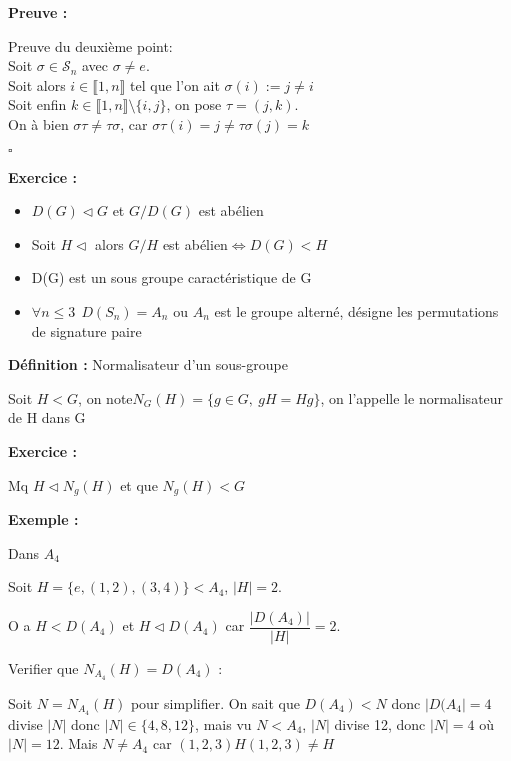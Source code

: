 \documentclass{report}
\renewenvironment{leftbar}{%
  \def\FrameCommand{\vrule width 0.4pt \hspace{10pt}}%
  \MakeFramed {\advance\hsize-\width \FrameRestore}}%
 {\endMakeFramed}%
\newenvironment{definition}[1][]{
    \begin{tcolorbox}[colframe= white]
    \textbf{Définition :} 
    #1 \par
    }
    {\end{tcolorbox}}
\newenvironment{preuve}{\vspace*{0.5cm}
    \begin{leftbar}
    \noindent\textbf{Preuve :}\par}{
    \begin{flushright}
    $\square$
    \end{flushright}
    \end{leftbar}
}
\newenvironment{exemple}{\begin{tcolorbox}[colback=gray!10,colframe= white]
    \textbf{Exemple :}
     \par}
    {\end{tcolorbox}}
\newenvironment{exo}{\begin{tcolorbox}[colframe= white]
    \textbf{Exercice :}
    \par}
    {\end{tcolorbox}}
\newcommand{\sn}{\mathcal{S}_{n}}
\begin{document}
\begin{preuve}
    Preuve du deuxième point:\\
    Soit $\sigma \in \sn$ avec $\sigma \neq e$.\\
    Soit alors $i\in \llbracket 1,n \rrbracket$ tel que l'on ait $\sigma(i):=j\neq i$\\
    Soit enfin $k\in \llbracket 1,n \rrbracket \setminus \{i,j\}$, on pose $\tau = (j,k)$.\\
    On à bien $\sigma\tau\neq\tau\sigma$, car $\sigma\tau(i)=j\neq\tau\sigma(j)=k$
\end{preuve}


\begin{exo}
    \begin{itemize}
        \item $D(G)\vartriangleleft G$ et $G/D(G)$ est abélien
        \item Soit $H \vartriangleleft$ alors $G/H$ est abélien$\Leftrightarrow D(G)<H$
        \item D(G) est un sous groupe caractéristique de G
        \item $\forall n \leq3 ~~D(S_{n})=A_{n}$ ou $A_{n}$ est le groupe alterné, désigne les permutations de signature paire
    \end{itemize}
\end{exo}

\begin{definition}[Normalisateur d'un sous-groupe]
Soit $H<G$, on note$N_{G}(H) = \{g\in G , ~gH=Hg\}$, on l'appelle le normalisateur de H dans G
\end{definition}

\begin{exo}
Mq $H\triangleleft N_{g}(H)$ et que $N_{g}(H)<G$
\end{exo}

\begin{exemple}
Dans $A_{4}$ \par
Soit $H =\{ e,(1,2),(3,4) \}<A_{4}$, $|H|=2$.  \par
O a $H<D(A_{4})$ et $H\triangleleft D(A_{4})$ car $\dfrac{|D(A_{4})|}{|H|}=2$.  \par
Verifier que $N_{A_{4}}(H)=D(A_{4})$ :  \par

Soit $N = N_{A_{4}}(H)$ pour simplifier. On sait que $D(A_{4})<N$ donc $|D(A_{4}|=4$ divise $|N|$ donc $|N|\in \{ 4,8,12 \}$, mais vu $N<A_{4}$, $|N|$ divise 12, donc $|N|=4$ où $|N|=12$. Mais $N\neq A_{4}$ car $(1,2,3)H(1,2,3)\neq H$  \par
\end{exemple}
\end{document}
